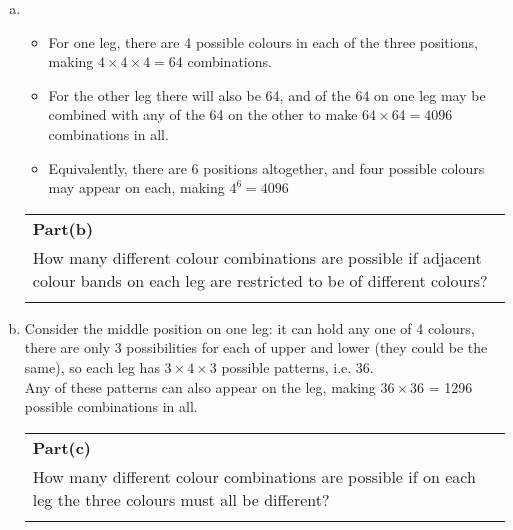 \documentclass[a4paper,12pt]{article}
\begin{document}
\begin{enumerate}[(a)]
\item  
\begin{itemize}
\item For one leg, there are 4 possible colours in each of the three positions, making
$4 \times 4 \times 4 = 64$ combinations.
\item For the other leg there will also be 64, and of the 64
on one leg may be combined with any of the 64 on the other to make $64 \times 64 = 4096$
combinations in all.

\item Equivalently, there are 6 positions altogether, and four possible colours may appear
on each, making $4^6 = 4096$
\end{itemize}



\newpage
  \begin{table}[ht!]
     \centering
     \begin{tabular}{|p{15cm}|}
     \hline  \large
\noindent \textbf{Part(b)}\\ \large \smallskip How many different colour combinations are possible if adjacent colour bands on each leg are restricted to be of different colours?    \\
 \\ \hline 
      \end{tabular}
    \end{table} 

\item Consider the middle position on one leg: it can hold any one of 4 colours, there
are only 3 possibilities for each of upper and lower (they could be the same), so each leg
has $3 \times 4 \times 3$ possible patterns, i.e. 36. 
\\ Any of these patterns can also appear on the leg,
making $36 \times 36$ = 1296 possible combinations in all.


\newpage


  \begin{table}[ht!]
     \centering
     \begin{tabular}{|p{15cm}|}
     \hline  
\noindent \textbf{Part(c)}\\ \smallskip \large How many different colour combinations are possible if on each leg the three colours must all be different?  \\
\smallskip
 \\ \hline 
      \end{tabular}
    \end{table} 
    

\end{enumerate}
\end{document}

